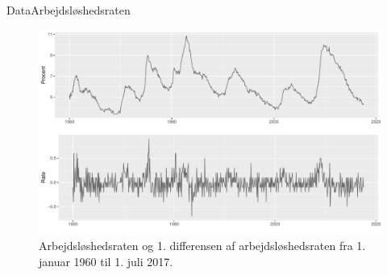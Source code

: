 \begin{frame}{Data}{Arbejdsløshedsraten}
%
\begin{figure}
 \includegraphics[width=1\linewidth, height=0.7\textheight]{slides/unemployment.pdf}
 \caption{Arbejdsløshedsraten og 1. differensen af arbejdsløshedsraten fra 1. januar 1960 til 1. juli 2017.}
 \end{figure}
%
\end{frame}

